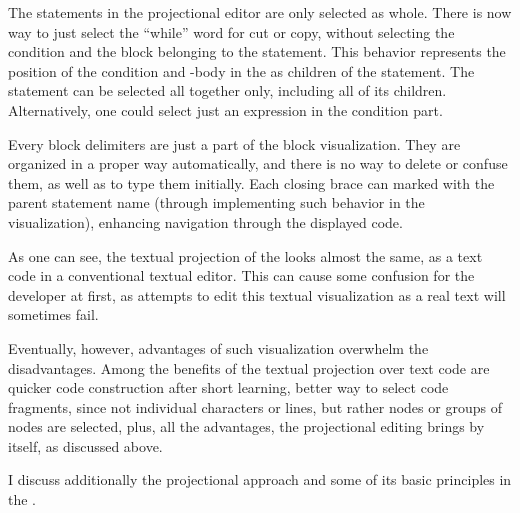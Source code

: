 The statements in the projectional editor are only selected as whole. There is now way to just select 
the ``while'' word for cut or copy, without selecting the condition and the block belonging to the statement. This behavior represents the position of the condition and -body in the  as children of the  statement. The statement can be selected all together only, including all of its children. Alternatively, one could select just an expression in the condition part.

Every block delimiters are just a part of the block visualization. They are organized in a proper way
automatically, and there is no way to delete or confuse them, as well as to type them initially. Each
closing brace can marked with the parent statement name (through implementing such behavior in the
 visualization), enhancing navigation through the displayed code.

As one can see, the textual projection of the  looks almost the same, as a text code in a 
conventional textual editor. This can cause some confusion for the developer at first, 
as attempts to edit this textual visualization as a real text will sometimes fail. 

Eventually, however, advantages of such visualization overwhelm the disadvantages. 
Among the benefits of the textual projection over text code are quicker code construction 
after short learning, better way to select code fragments, since not individual 
characters or lines, but rather  nodes or groups of nodes are selected, 
plus, all the advantages, the projectional editing brings by itself, as discussed above.

I discuss additionally the projectional approach and some of its basic 
principles in the .